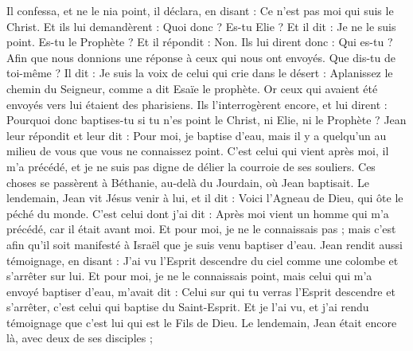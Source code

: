 \begin{multicols}{2}
Il confessa, et ne le nia point, il déclara, en disant : Ce n'est pas moi qui suis le Christ.
Et ils lui demandèrent : Quoi donc ? Es-tu Elie ? Et il dit : Je ne le suis point. Es-tu le Prophète ? Et il répondit : Non.
Ils lui dirent donc : Qui es-tu ? Afin que nous donnions une réponse à ceux qui nous ont envoyés. Que dis-tu de toi-même ?
Il dit : Je suis la voix de celui qui crie dans le désert : Aplanissez le chemin du Seigneur, comme a dit Esaïe le prophète.
Or ceux qui avaient été envoyés vers lui étaient des pharisiens.
Ils l'interrogèrent encore, et lui dirent : Pourquoi donc baptises-tu si tu n'es point le Christ, ni Elie, ni le Prophète ?
Jean leur répondit et leur dit : Pour moi, je baptise d'eau, mais il y a quelqu'un au milieu de vous que vous ne connaissez point.
C'est celui qui vient après moi, il m'a précédé, et je ne suis pas digne de délier la courroie de ses souliers.
Ces choses se passèrent à Béthanie, au-delà du Jourdain, où Jean baptisait.
Le lendemain, Jean vit Jésus venir à lui, et il dit : Voici l'Agneau de Dieu, qui ôte le péché du monde.
C'est celui dont j'ai dit : Après moi vient un homme qui m'a précédé, car il était avant moi.
Et pour moi, je ne le connaissais pas ; mais c'est afin qu'il soit manifesté à Israël que je suis venu baptiser d'eau.
Jean rendit aussi témoignage, en disant : J'ai vu l'Esprit descendre du ciel comme une colombe et s'arrêter sur lui.
Et pour moi, je ne le connaissais point, mais celui qui m'a envoyé baptiser d'eau, m'avait dit : Celui sur qui tu verras l'Esprit descendre et s'arrêter, c'est celui qui baptise du Saint-Esprit.
Et je l'ai vu, et j'ai rendu témoignage que c'est lui qui est le Fils de Dieu.
Le lendemain, Jean était encore là, avec deux de ses disciples ;

\end{multicols}
